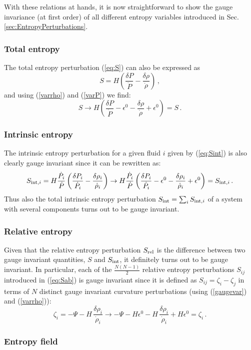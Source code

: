 \documentclass[a4paper,11pt]{article}
\def\be{\begin{equation}}
\def\ee{\end{equation}}
\begin{document}
With these relations at hands, it is now straightforward to show the gauge invariance (at first order) of all different entropy variables introduced in Sec. \ref{sec:EntropyPerturbations}.

\subsubsection*{Total entropy}

The total entropy perturbation (\ref{eq:S}) can also be expressed as
\be
S=H \left( \frac{\delta P}{\dot P} -\frac{\delta \rho}{\dot \rho} \right) \,,
\ee
and using (\ref{varrho}) and (\ref{varP}) we find:
\be
S\to H \left( \frac{\delta P}{\dot P} -\epsilon^0 -\frac{\delta \rho}{\dot \rho} +\epsilon^0 \right) =S\,.
\ee

\subsubsection*{Intrinsic entropy}

The intrinsic entropy perturbation for a given fluid $i$ given by (\ref{eq:Sint}) is also clearly gauge invariant since it can be rewritten as:
\be
S_{{\rm int},i}=H \frac{\dot P_i}{\dot P} \left( \frac{\delta P_i}{\dot P_i} -\frac{\delta \rho_i}{\dot \rho_i} \right) \to 
H \frac{\dot P_i}{\dot P} \left( \frac{\delta P_i}{\dot P_i} -\epsilon^0 -\frac{\delta \rho_i}{\dot \rho_i} +\epsilon^0\right) = S_{{\rm int},i}\,.
\ee
Thus also the total intrinsic entropy perturbation $S_{\rm int}=\sum_i S_{{\rm int},i}$ of a system with several components turns out to be gauge invariant.


\subsubsection*{Relative entropy}

Given that the relative entropy perturbation $S_{\rm rel}$ is the difference between two gauge invariant quantities, $S$ and $S_{\rm int}$, it definitely turns out to be gauge invariant. In particular, each of the $\frac{N(N-1)}{2}$ relative entropy perturbations $S_{ij}$ introduced in (\ref{eq:Sab}) is gauge invariant since it is defined as $S_{ij}= \zeta_i-\zeta_j$ in terms of $N$ distinct gauge invariant curvature perturbations (using (\ref{gaugevar}) and (\ref{varrho})):
\be
\zeta_i = - \Psi-H \,\frac{\delta \rho_i}{\dot \rho_i}\to - \Psi - H\epsilon^0 -H \,\frac{\delta \rho_i}{\dot \rho_i} + H\epsilon^0 = \zeta_i\,.
\ee

\subsubsection*{Entropy field}
\end{document}
